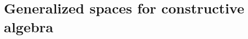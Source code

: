 \documentclass{ws-rv9x6}
\begin{document}
{
\newcommand{\hcancel}[5]{%
  \tikz[baseline=(tocancel.base)]{
    \node[inner sep=0pt,outer sep=0pt] (tocancel) {#1};
    \draw[black, line width=0.2mm] ($(tocancel.south west)+(#2,#3)$) -- ($(tocancel.north east)+(#4,#5)$);
  }%
}
\newtheorem{exercise}{Exercise}
\let\Exercisefont\upshape
\def\Exerciseheadfont{\bfseries}

\newcommand{\CCC}{\mathcal{C}}
\newcommand{\OOO}{\mathcal{O}}
\newcommand{\NN}{\mathbb{N}}
\newcommand{\QQ}{\mathbb{Q}}
\newcommand{\RR}{\mathbb{R}}
\newcommand{\TT}{\mathbb{T}}
\newcommand{\ZZ}{\mathbb{Z}}
\newcommand{\CC}{\mathbb{C}}
\newcommand{\aaa}{\mathfrak{a}}
\newcommand{\bbb}{\mathfrak{b}}
\newcommand{\ppp}{\mathfrak{p}}
\newcommand{\qqq}{\mathfrak{q}}
\newcommand{\mmm}{\mathfrak{m}}
\newcommand{\fff}{\mathfrak{f}}
\newcommand{\defeq}{\vcentcolon=}
\newcommand{\defeqv}{\vcentcolon\equiv}
\newcommand{\Sh}{\mathrm{Sh}}
\newcommand{\ab}{\mathrm{ab}}
\newcommand{\op}{\mathrm{op}}
\newcommand{\Set}{\mathrm{Set}}
\newcommand{\Hom}{\mathrm{Hom}}
\newcommand{\Spec}{\mathrm{Spec}}
\newcommand{\Max}{\mathrm{Max}}
\newcommand{\Gal}{\mathrm{Gal}}
\newcommand{\Rad}{\mathrm{Rad}}
\newcommand{\Idl}{\mathrm{Idl}}
\newcommand{\+}{\mathpunct{.}}
\newcommand{\?}{\,{:}\,}
\newcommand{\seq}[1]{\mathrel{\vdash\!\!\!_{#1}}}
\newcommand{\pt}{\mathrm{pt}}
\newcommand{\Pt}{\mathrm{Pt}}
\newcommand{\Loc}{\mathrm{Loc}}
\newcommand{\Top}{\mathrm{Top}}
\newcommand{\ann}{\operatorname{ann}}
\newcommand{\BPIT}{\textsc{bpit}\xspace}
\newcommand{\notnot}{\emph{not not}\xspace}
\newcommand{\negg}{\neg\!\!\!\neg}
\newcommand{\bott}{\bot\!\!\!\!\bot}
\newcommand{\brak}[1]{{\llbracket{#1}\rrbracket}}

\chapter{Generalized spaces for constructive algebra}

\author[I. Blechschmidt]{Ingo Blechschmidt}

\address{Università di Verona \\
Department of Computer Science \\
Strada le Grazie 15 \\
37134 Verona, Italy}

}
\end{document}
